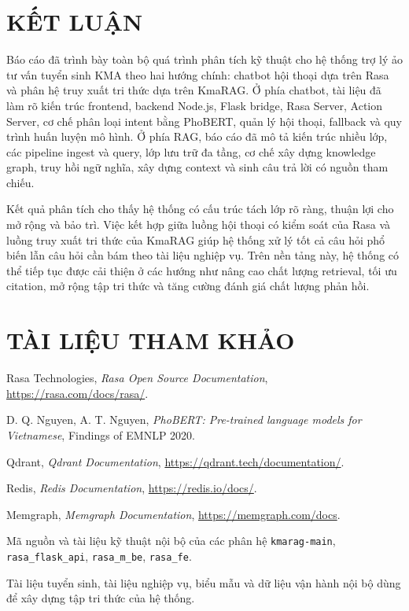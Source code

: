 \clearpage
\chapter*{KẾT LUẬN}
{}

Báo cáo đã trình bày toàn bộ quá trình phân tích kỹ thuật cho hệ thống trợ lý ảo tư vấn tuyển sinh KMA theo hai hướng chính: chatbot hội thoại dựa trên Rasa và phân hệ truy xuất tri thức dựa trên KmaRAG. Ở phía chatbot, tài liệu đã làm rõ kiến trúc frontend, backend Node.js, Flask bridge, Rasa Server, Action Server, cơ chế phân loại intent bằng PhoBERT, quản lý hội thoại, fallback và quy trình huấn luyện mô hình. Ở phía RAG, báo cáo đã mô tả kiến trúc nhiều lớp, các pipeline ingest và query, lớp lưu trữ đa tầng, cơ chế xây dựng knowledge graph, truy hồi ngữ nghĩa, xây dựng context và sinh câu trả lời có nguồn tham chiếu.

Kết quả phân tích cho thấy hệ thống có cấu trúc tách lớp rõ ràng, thuận lợi cho mở rộng và bảo trì. Việc kết hợp giữa luồng hội thoại có kiểm soát của Rasa và luồng truy xuất tri thức của KmaRAG giúp hệ thống xử lý tốt cả câu hỏi phổ biến lẫn câu hỏi cần bám theo tài liệu nghiệp vụ. Trên nền tảng này, hệ thống có thể tiếp tục được cải thiện ở các hướng như nâng cao chất lượng retrieval, tối ưu citation, mở rộng tập tri thức và tăng cường đánh giá chất lượng phản hồi.

\clearpage
\chapter*{TÀI LIỆU THAM KHẢO}
{}

\begingroup
\footnotesize
\renewcommand{\baselinestretch}{1.0}\selectfont
\setlength{\parskip}{0pt}
\setlength{\itemsep}{1pt}
\setlength{\parsep}{0pt}
\setlength{\topsep}{2pt}
\begin{enumerate}[leftmargin=1.2cm,label={[\arabic*]},itemsep=1pt,topsep=2pt]
\item Rasa Technologies, \textit{Rasa Open Source Documentation}, \url{https://rasa.com/docs/rasa/}.
\item D. Q. Nguyen, A. T. Nguyen, \textit{PhoBERT: Pre-trained language models for Vietnamese}, Findings of EMNLP 2020.
\item Qdrant, \textit{Qdrant Documentation}, \url{https://qdrant.tech/documentation/}.
\item Redis, \textit{Redis Documentation}, \url{https://redis.io/docs/}.
\item Memgraph, \textit{Memgraph Documentation}, \url{https://memgraph.com/docs}.
\item Mã nguồn và tài liệu kỹ thuật nội bộ của các phân hệ \texttt{kmarag-main}, \texttt{rasa\_flask\_api}, \texttt{rasa\_m\_be}, \texttt{rasa\_fe}.
\item Tài liệu tuyển sinh, tài liệu nghiệp vụ, biểu mẫu và dữ liệu vận hành nội bộ dùng để xây dựng tập tri thức của hệ thống.
\end{enumerate}
\endgroup
